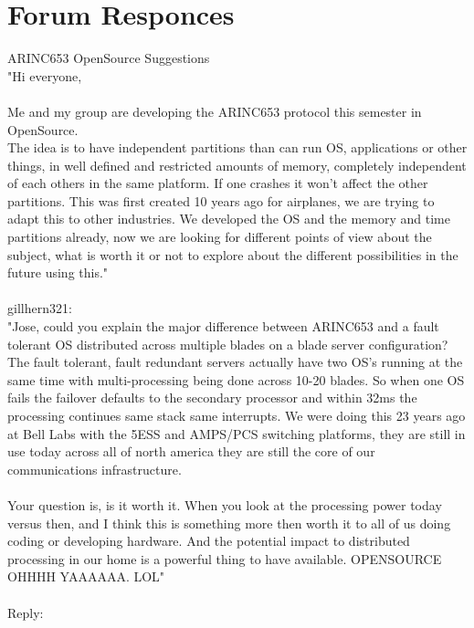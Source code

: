 \chapter{Forum Responces}

ARINC653 OpenSource Suggestions\\

"Hi everyone,\\
\\

Me and my group are developing the ARINC653 protocol this semester in OpenSource.\\
The idea is to have independent partitions than can run OS, applications or other things, in well defined
and restricted amounts of memory, completely independent of each others in the same platform. If one
crashes it won't affect the other partitions. This was first created 10 years ago for airplanes, we are
trying to adapt this to other industries. We developed the OS and the memory and time partitions already,
now we are looking for different points of view about the subject, what is worth it or not to explore 
about the different possibilities in the future using this."\\
\\
gillhern321:\\

"Jose, could you explain the major difference between ARINC653 and a fault tolerant OS distributed across 
multiple blades on a blade server configuration? The fault tolerant, fault redundant servers actually have 
two OS's running at the same time with multi-processing being done across 10-20 blades. So when one OS 
fails the failover defaults to the secondary processor and within 32ms the processing continues same stack 
same interrupts. We were doing this 23 years ago at Bell Labs with the 5ESS and AMPS/PCS switching 
platforms, they are still in use today across all of north america they are still the core of our 
communications infrastructure.\\
\\

Your question is, is it worth it. When you look at the processing power today versus then,  and I think 
this is something more then worth it to all of us doing coding or developing hardware. And the potential 
impact to distributed processing in our home is a powerful thing to have available.  OPENSOURCE     OHHHH 
YAAAAAA. LOL"\\
\\
Reply:\\


